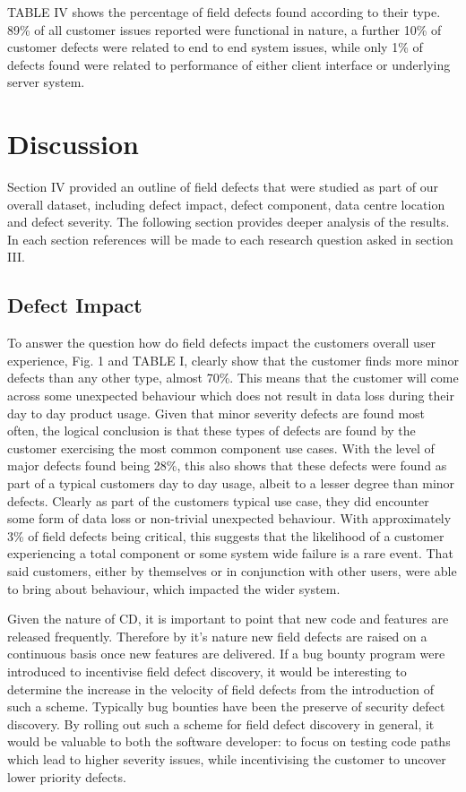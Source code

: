 \documentclass[conference]{IEEEtran}
\begin{document}
TABLE IV shows the percentage of field defects found according to their type. 89\% of all customer issues reported were functional in nature, a further 10\% of customer defects were related to end to end system issues, while only 1\% of defects found were related to performance of either client interface or underlying server system. 

\section{Discussion}

Section IV provided an outline of field defects that were studied as part of our overall dataset, including defect impact, defect component, data centre location and defect severity. The following section provides deeper analysis of the results. In each section references will be made to each research question asked in section III.

\subsection{Defect Impact}

To answer the question how do field defects impact the customers overall user experience, Fig. 1 and TABLE I, clearly show that the customer finds more minor defects than any other type, almost 70\%. This means that the customer will come across some unexpected behaviour which does not result in data loss during their day to day product usage. Given that minor severity defects are found most often, the logical conclusion is that these types of defects are found by the customer exercising the most common component use cases. With the level of major defects found being 28\%, this also shows that these defects were found as part of a typical customers day to day usage, albeit to a lesser degree than minor defects. Clearly as part of the customers typical use case, they did encounter some form of data loss or non-trivial unexpected behaviour. With approximately 3\% of field defects being critical, this suggests that the likelihood of a customer experiencing a total component or some system wide failure is a rare event. That said customers, either by themselves or in conjunction with other users, were able to bring about behaviour, which impacted the wider system. \par
Given the nature of CD, it is important to point that new code and features are released frequently. Therefore by it's nature new field defects are raised on a continuous basis once new features are delivered. If a bug bounty program were introduced to incentivise field defect discovery, it would be interesting to determine the increase in the velocity of field defects from the introduction of such a scheme. Typically bug bounties have been the preserve of security defect discovery. By rolling out such a scheme for field defect discovery in general, it would be valuable to both the software developer: to focus on testing code paths which lead to higher severity issues, while incentivising the customer to uncover lower priority defects.
\end{document}
